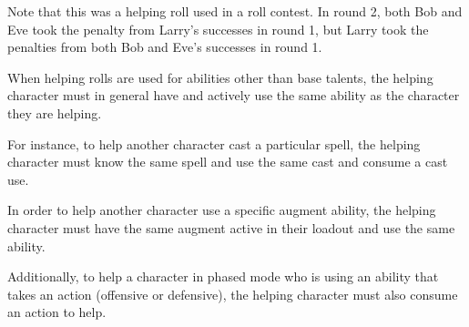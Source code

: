Note that this was a helping roll used in a roll contest. In round 2, both Bob and Eve took the penalty from Larry's successes in round 1, but Larry took the penalties from both Bob and Eve's successes in round 1.

When helping rolls are used for abilities other than base talents, the helping character must in general have and actively use the same ability as the character they are helping.

For instance, to help another character cast a particular spell, the helping character must know the same spell and use the same cast and consume a cast use.

In order to help another character use a specific augment ability, the helping character must have the same augment active in their loadout and use the same ability.

Additionally, to help a character in phased mode who is using an ability that takes an action (offensive or defensive), the helping character must also consume an action to help.

